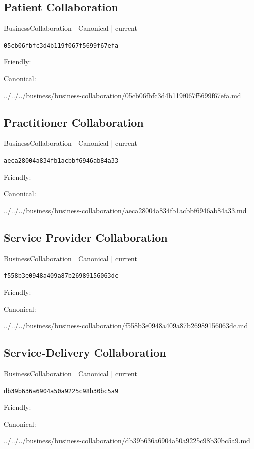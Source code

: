 \documentclass[10pt,a4paper]{article}
\begin{document}
\subsection*{Patient Collaboration}
{\small BusinessCollaboration | Canonical | current}\par
\texttt{05cb06fbfc3d4b119f067f5699f67efa}\par
Friendly: \par
Canonical: \par
{\footnotesize\url{../../../business/business-collaboration/05cb06fbfc3d4b119f067f5699f67efa.md}}\par
\subsection*{Practitioner Collaboration}
{\small BusinessCollaboration | Canonical | current}\par
\texttt{aeca28004a834fb1acbbf6946ab84a33}\par
Friendly: \par
Canonical: \par
{\footnotesize\url{../../../business/business-collaboration/aeca28004a834fb1acbbf6946ab84a33.md}}\par
\subsection*{Service Provider Collaboration}
{\small BusinessCollaboration | Canonical | current}\par
\texttt{f558b3e0948a409a87b26989156063dc}\par
Friendly: \par
Canonical: \par
{\footnotesize\url{../../../business/business-collaboration/f558b3e0948a409a87b26989156063dc.md}}\par
\subsection*{Service-Delivery Collaboration}
{\small BusinessCollaboration | Canonical | current}\par
\texttt{db39b636a6904a50a9225c98b30bc5a9}\par
Friendly: \par
Canonical: \par
{\footnotesize\url{../../../business/business-collaboration/db39b636a6904a50a9225c98b30bc5a9.md}}\par
\end{document}
